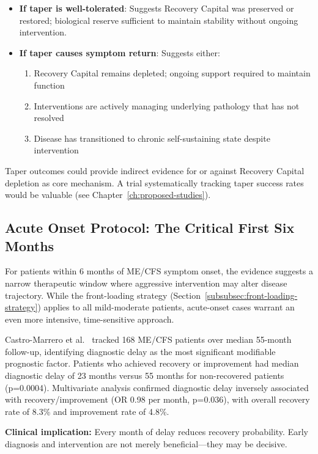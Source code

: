 \begin{itemize}
    \item \textbf{If taper is well-tolerated}: Suggests Recovery Capital was preserved or restored; biological reserve sufficient to maintain stability without ongoing intervention.

    \item \textbf{If taper causes symptom return}: Suggests either:
    \begin{enumerate}
        \item Recovery Capital remains depleted; ongoing support required to maintain function
        \item Interventions are actively managing underlying pathology that has not resolved
        \item Disease has transitioned to chronic self-sustaining state despite intervention
    \end{enumerate}
\end{itemize}

Taper outcomes could provide indirect evidence for or against Recovery Capital depletion as core mechanism. A trial systematically tracking taper success rates would be valuable (see Chapter~\ref{ch:proposed-studies}).

\subsection{Acute Onset Protocol: The Critical First Six Months}
\label{subsec:acute-onset-protocol}

For patients within 6 months of ME/CFS symptom onset, the evidence suggests a narrow therapeutic window where aggressive intervention may alter disease trajectory. While the front-loading strategy (Section~\ref{subsubsec:front-loading-strategy}) applies to all mild-moderate patients, acute-onset cases warrant an even more intensive, time-sensitive approach.

\begin{achievement}
\label{ach:diagnostic-delay-recovery}
Castro-Marrero et al.~\cite{CastroMarrero2022prognosis} tracked 168 ME/CFS patients over median 55-month follow-up, identifying diagnostic delay as the most significant modifiable prognostic factor. Patients who achieved recovery or improvement had median diagnostic delay of 23 months versus 55 months for non-recovered patients (p=0.0004). Multivariate analysis confirmed diagnostic delay inversely associated with recovery/improvement (OR 0.98 per month, p=0.036), with overall recovery rate of 8.3\% and improvement rate of 4.8\%.

\textbf{Clinical implication:} Every month of delay reduces recovery probability. Early diagnosis and intervention are not merely beneficial---they may be decisive.
\end{achievement}

